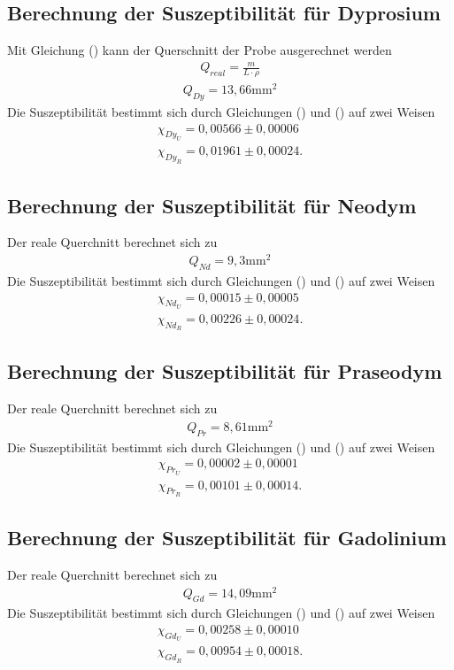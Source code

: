 \subsection{Berechnung der Suszeptibilität für Dyprosium}
Mit Gleichung () kann der Querschnitt der Probe ausgerechnet werden
\begin{align*}
Q_{real} = \frac{m}{L \cdot \rho}
\end{align*}
\begin{align*}
Q_{Dy} = 13,66 \si{\milli\meter}^2
\end{align*}
Die Suszeptibilität bestimmt sich durch Gleichungen () und () auf zwei Weisen
\begin{align*}
\chi_{Dy_U} = 0,00566 \pm 0,00006 \\
\chi_{Dy_R} = 0,01961 \pm 0,00024 .
\end{align*}

\subsection{Berechnung der Suszeptibilität für Neodym}
Der reale Querchnitt berechnet sich zu
\begin{align*}
Q_{Nd} = 9,3 \si{\milli\meter}^2
\end{align*}
Die Suszeptibilität bestimmt sich durch Gleichungen () und () auf zwei Weisen
\begin{align*}
\chi_{Nd_U} = 0,00015 \pm 0,00005 \\
\chi_{Nd_R} = 0,00226 \pm 0,00024 .
\end{align*}

\subsection{Berechnung der Suszeptibilität für Praseodym}
Der reale Querchnitt berechnet sich zu
\begin{align*}
Q_{Pr} = 8,61 \si{\milli\meter}^2
\end{align*}
Die Suszeptibilität bestimmt sich durch Gleichungen () und () auf zwei Weisen
\begin{align*}
\chi_{Pr_U} = 0,00002 \pm 0,00001 \\
\chi_{Pr_R} = 0,00101 \pm 0,00014 .
\end{align*}

\subsection{Berechnung der Suszeptibilität für Gadolinium}
Der reale Querchnitt berechnet sich zu
\begin{align*}
Q_{Gd} = 14,09 \si{\milli\meter}^2
\end{align*}
Die Suszeptibilität bestimmt sich durch Gleichungen () und () auf zwei Weisen
\begin{align*}
\chi_{Gd_U} = 0,00258 \pm 0,00010 \\
\chi_{Gd_R} = 0,00954 \pm 0,00018 .
\end{align*}


